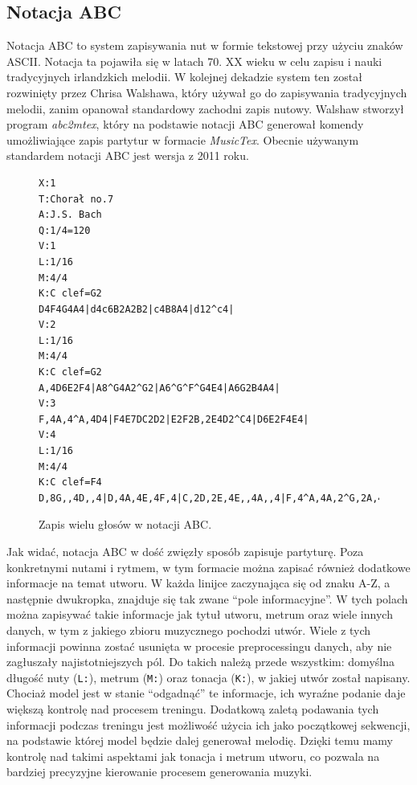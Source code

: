 \documentclass[data-science]{agh-wi} %
\begin{document}
\subsection{Notacja ABC}
Notacja ABC to system zapisywania nut w formie tekstowej przy użyciu znaków ASCII. Notacja ta pojawiła się w latach 70. XX wieku w celu zapisu i nauki tradycyjnych irlandzkich melodii. W kolejnej dekadzie system ten został rozwinięty przez Chrisa Walshawa, który używał go do zapisywania tradycyjnych melodii, zanim opanował standardowy zachodni zapis nutowy. Walshaw stworzył program \textit{abc2mtex}, który na podstawie notacji ABC generował komendy umożliwiające zapis partytur w formacie \textit{MusicTex}. Obecnie używanym standardem notacji ABC jest wersja z 2011 roku.

\begin{figure}[ht!]
    \begin{verbatim}
X:1
T:Chorał no.7
A:J.S. Bach
Q:1/4=120
V:1
L:1/16
M:4/4
K:C clef=G2
D4F4G4A4|d4c6B2A2B2|c4B8A4|d12^c4|
V:2
L:1/16
M:4/4
K:C clef=G2
A,4D6E2F4|A8^G4A2^G2|A6^G^F^G4E4|A6G2B4A4|
V:3
F,4A,4^A,4D4|F4E7DC2D2|E2F2B,2E4D2^C4|D6E2F4E4|
V:4
L:1/16
M:4/4
K:C clef=F4
D,8G,,4D,,4|D,4A,4E,4F,4|C,2D,2E,4E,,4A,,4|F,4^A,4A,2^G,2A,4|        
\end{verbatim}
    \caption{Zapis wielu głosów w notacji ABC.}\label{fig:abc_polyphony}
\end{figure}

Jak widać, notacja ABC w dość zwięzły sposób zapisuje partyturę. Poza konkretnymi nutami i rytmem, w tym formacie można zapisać również dodatkowe informacje na temat utworu. W każda linijce zaczynająca się od znaku A-Z, a następnie dwukropka, znajduje się tak zwane ``pole informacyjne''. W tych polach można zapisywać takie informacje jak tytuł utworu, metrum oraz wiele innych danych, w tym z jakiego zbioru muzycznego pochodzi utwór. Wiele z tych informacji powinna zostać usunięta w procesie preprocessingu danych, aby nie zagłuszały najistotniejszych pól. Do takich należą przede wszystkim: domyślna długość nuty (\texttt{L:}), metrum (\texttt{M:}) oraz tonacja (\texttt{K:}), w jakiej utwór został napisany. Chociaż model jest w stanie ``odgadnąć'' te informacje, ich wyraźne podanie daje większą kontrolę nad procesem treningu. Dodatkową zaletą podawania tych informacji podczas treningu jest możliwość użycia ich jako początkowej sekwencji, na podstawie której model będzie dalej generował melodię. Dzięki temu mamy kontrolę nad takimi aspektami jak tonacja i metrum utworu, co pozwala na bardziej precyzyjne kierowanie procesem generowania muzyki.
\end{document}

